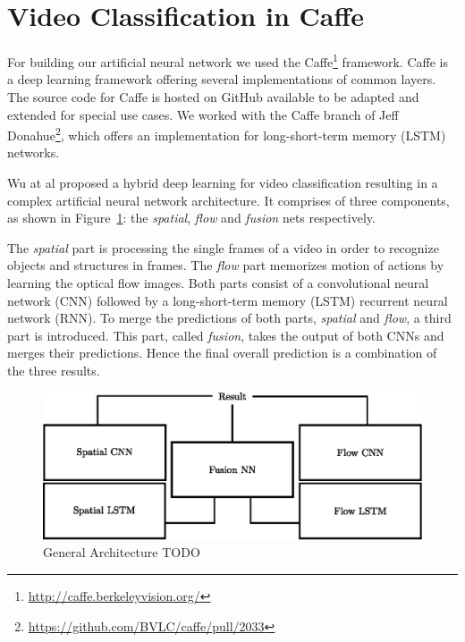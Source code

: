 \section{Video Classification in Caffe}
\label{sec:classification}

For building our artificial neural network we used the  Caffe\footnote{\url{http://caffe.berkeleyvision.org/}} framework.
Caffe is a deep learning framework offering several implementations of common layers.
The source code for Caffe is hosted on GitHub available to be adapted and extended for special use cases.
We worked with the Caffe branch of Jeff Donahue\footnote{\url{https://github.com/BVLC/caffe/pull/2033}}, which offers an implementation for long-short-term memory (LSTM) networks.

Wu at al \cite{wu2015modeling} proposed a hybrid deep learning for video classification resulting in a complex artificial neural network architecture.
It comprises of three components, as shown in Figure~\ref{fig:architecture}: the \emph{spatial}, \emph{flow} and \emph{fusion} nets respectively.

The \emph{spatial} part is processing the single frames of a video in order to recognize objects and structures in frames.
The \emph{flow} part memorizes motion of actions by learning the optical flow images.
Both parts consist of a convolutional neural network (CNN) followed by a long-short-term memory (LSTM) recurrent neural network (RNN).
To merge the predictions of both parts, \emph{spatial} and \emph{flow}, a third part is introduced.
This part, called \emph{fusion}, takes the output of both CNNs and merges their predictions.
Hence the final overall prediction is a combination of the three results.

\begin{figure}[!htb]
	\centering
	\includegraphics[scale=.7]{images/architecture.eps}
	\caption{General Architecture TODO}
	\label{fig:architecture}
\end{figure}

